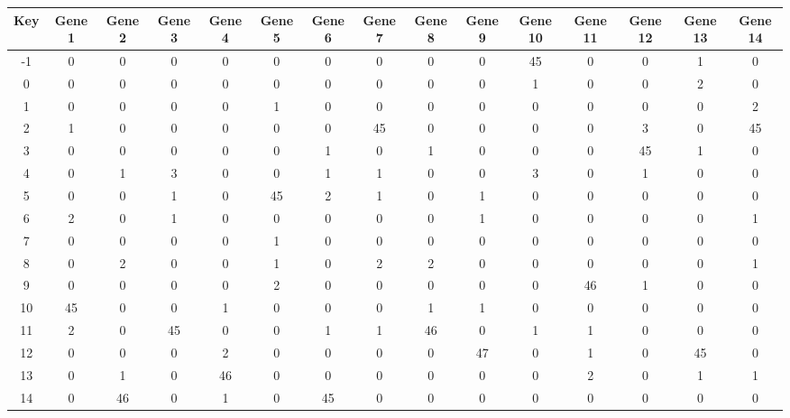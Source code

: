 \begin{tabular}{|c|c|c|c|c|c|c|c|c|c|c|c|c|c|c|}
\hline
Key & Gene 1 & Gene 2 & Gene 3 & Gene 4 & Gene 5 & Gene 6 & Gene 7 & Gene 8 & Gene 9 & Gene 10 & Gene 11 & Gene 12 & Gene 13 & Gene 14 \\
\hline
-1 & 0 & 0 & 0 & 0 & 0 & 0 & 0 & 0 & 0 & 45 & 0 & 0 & 1 & 0 \\
0 & 0 & 0 & 0 & 0 & 0 & 0 & 0 & 0 & 0 & 1 & 0 & 0 & 2 & 0 \\
1 & 0 & 0 & 0 & 0 & 1 & 0 & 0 & 0 & 0 & 0 & 0 & 0 & 0 & 2 \\
2 & 1 & 0 & 0 & 0 & 0 & 0 & 45 & 0 & 0 & 0 & 0 & 3 & 0 & 45 \\
3 & 0 & 0 & 0 & 0 & 0 & 1 & 0 & 1 & 0 & 0 & 0 & 45 & 1 & 0 \\
4 & 0 & 1 & 3 & 0 & 0 & 1 & 1 & 0 & 0 & 3 & 0 & 1 & 0 & 0 \\
5 & 0 & 0 & 1 & 0 & 45 & 2 & 1 & 0 & 1 & 0 & 0 & 0 & 0 & 0 \\
6 & 2 & 0 & 1 & 0 & 0 & 0 & 0 & 0 & 1 & 0 & 0 & 0 & 0 & 1 \\
7 & 0 & 0 & 0 & 0 & 1 & 0 & 0 & 0 & 0 & 0 & 0 & 0 & 0 & 0 \\
8 & 0 & 2 & 0 & 0 & 1 & 0 & 2 & 2 & 0 & 0 & 0 & 0 & 0 & 1 \\
9 & 0 & 0 & 0 & 0 & 2 & 0 & 0 & 0 & 0 & 0 & 46 & 1 & 0 & 0 \\
10 & 45 & 0 & 0 & 1 & 0 & 0 & 0 & 1 & 1 & 0 & 0 & 0 & 0 & 0 \\
11 & 2 & 0 & 45 & 0 & 0 & 1 & 1 & 46 & 0 & 1 & 1 & 0 & 0 & 0 \\
12 & 0 & 0 & 0 & 2 & 0 & 0 & 0 & 0 & 47 & 0 & 1 & 0 & 45 & 0 \\
13 & 0 & 1 & 0 & 46 & 0 & 0 & 0 & 0 & 0 & 0 & 2 & 0 & 1 & 1 \\
14 & 0 & 46 & 0 & 1 & 0 & 45 & 0 & 0 & 0 & 0 & 0 & 0 & 0 & 0 \\
\hline
\end{tabular}
